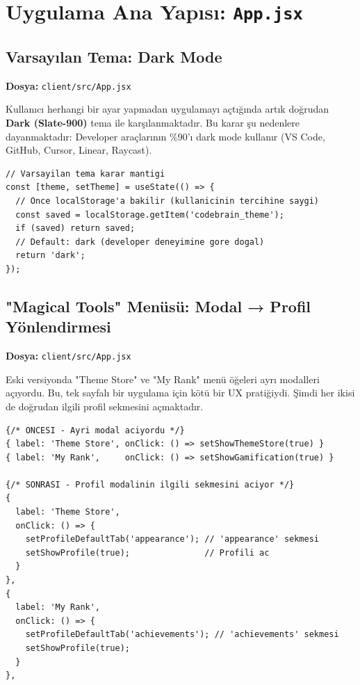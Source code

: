 \documentclass[12pt,a4paper]{article}
\begin{document}
\section{Uygulama Ana Yapısı: \texttt{App.jsx}}

\subsection{Varsayılan Tema: Dark Mode}

\textbf{Dosya:} \texttt{client/src/App.jsx}

Kullanıcı herhangi bir ayar yapmadan uygulamayı açtığında artık doğrudan \textbf{Dark (Slate-900)} tema ile karşılanmaktadır. Bu karar şu nedenlere dayanmaktadır: Developer araçlarının \%90'ı dark mode kullanır (VS Code, GitHub, Cursor, Linear, Raycast).

\begin{lstlisting}[language=JSX, caption={Default Dark Theme - App.jsx}]
// Varsayilan tema karar mantigi
const [theme, setTheme] = useState(() => {
  // Once localStorage'a bakilir (kullanicinin tercihine saygi)
  const saved = localStorage.getItem('codebrain_theme');
  if (saved) return saved;
  // Default: dark (developer deneyimine gore dogal)
  return 'dark';
});
\end{lstlisting}

\subsection{"Magical Tools" Menüsü: Modal → Profil Yönlendirmesi}

\textbf{Dosya:} \texttt{client/src/App.jsx}

Eski versiyonda "Theme Store" ve "My Rank" menü öğeleri ayrı modalleri açıyordu. Bu, tek sayfalı bir uygulama için kötü bir UX pratiğiydi. Şimdi her ikisi de doğrudan ilgili profil sekmesini açmaktadır.

\begin{lstlisting}[language=JSX, caption={Magical Tools Menüsü - Modal Yerine Profil - App.jsx}]
{/* ONCESI - Ayri modal aciyordu */}
{ label: 'Theme Store', onClick: () => setShowThemeStore(true) }
{ label: 'My Rank',     onClick: () => setShowGamification(true) }

{/* SONRASI - Profil modalinin ilgili sekmesini aciyor */}
{
  label: 'Theme Store',
  onClick: () => {
    setProfileDefaultTab('appearance'); // 'appearance' sekmesi
    setShowProfile(true);               // Profili ac
  }
},
{
  label: 'My Rank',
  onClick: () => {
    setProfileDefaultTab('achievements'); // 'achievements' sekmesi
    setShowProfile(true);
  }
},
\end{lstlisting}
\end{document}
